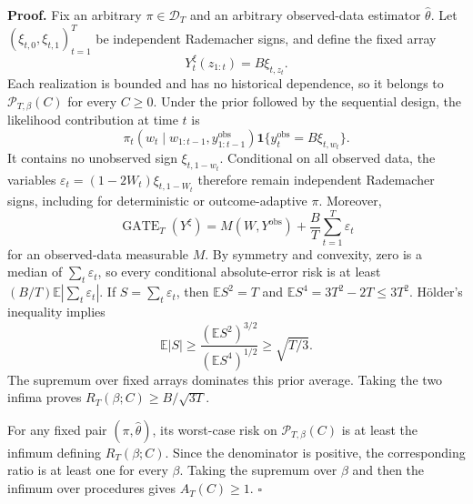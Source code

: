 \textbf{Proof.} Fix an arbitrary \(\pi\in\mathcal D_T\) and an arbitrary observed-data estimator \(\widehat\theta\). Let \((\xi_{t,0},\xi_{t,1})_{t=1}^T\) be independent Rademacher signs, and define the fixed array
\[
Y_t^\xi(z_{1:t})=B\xi_{t,z_t}.
\]
Each realization is bounded and has no historical dependence, so it belongs to \(\mathcal P_{T,\beta}(C)\) for every \(C\ge0\). Under the prior followed by the sequential design, the likelihood contribution at time \(t\) is
\[
\pi_t(w_t\mid w_{1:t-1},y_{1:t-1}^{\mathrm{obs}})
\mathbf1\{y_t^{\mathrm{obs}}=B\xi_{t,w_t}\}.
\]
It contains no unobserved sign \(\xi_{t,1-w_t}\). Conditional on all observed data, the variables \(\varepsilon_t=(1-2W_t)\xi_{t,1-W_t}\) therefore remain independent Rademacher signs, including for deterministic or outcome-adaptive \(\pi\). Moreover,
\[
\operatorname{GATE}_T(Y^\xi)
=M(W,Y^{\mathrm{obs}})+\frac BT\sum_{t=1}^T\varepsilon_t
\]
for an observed-data measurable \(M\). By symmetry and convexity, zero is a median of \(\sum_t\varepsilon_t\), so every conditional absolute-error risk is at least \((B/T)\mathbb E|\sum_t\varepsilon_t|\). If \(S=\sum_t\varepsilon_t\), then \(\mathbb ES^2=T\) and \(\mathbb ES^4=3T^2-2T\le3T^2\). Hölder's inequality implies
\[
\mathbb E|S|\ge
\frac{(\mathbb ES^2)^{3/2}}{(\mathbb ES^4)^{1/2}}
\ge\sqrt{T/3}.
\]
The supremum over fixed arrays dominates this prior average. Taking the two infima proves \(R_T(\beta;C)\ge B/\sqrt{3T}\).

For any fixed pair \((\pi,\widehat\theta)\), its worst-case risk on \(\mathcal P_{T,\beta}(C)\) is at least the infimum defining \(R_T(\beta;C)\). Since the denominator is positive, the corresponding ratio is at least one for every \(\beta\). Taking the supremum over \(\beta\) and then the infimum over procedures gives \(A_T(C)\ge1\). \(\square\)
